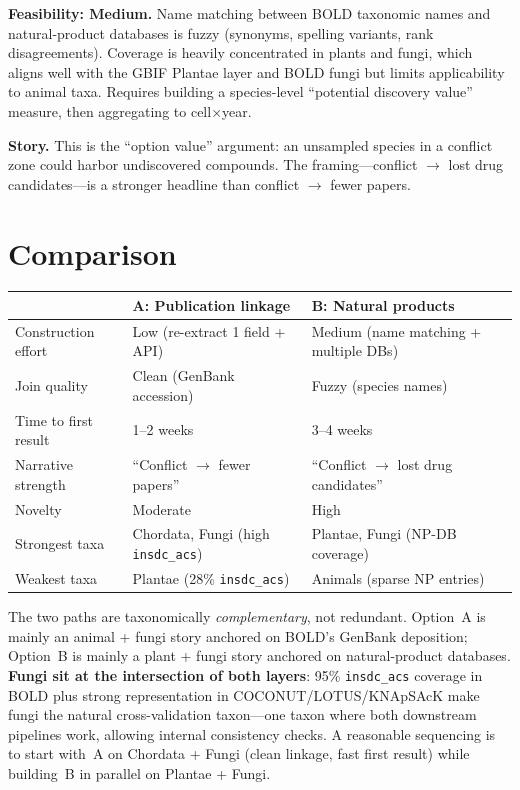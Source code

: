 \documentclass[10pt]{article}
\begin{document}
\textbf{Feasibility: Medium.} Name matching between BOLD taxonomic names and natural-product databases is fuzzy (synonyms, spelling variants, rank disagreements). Coverage is heavily concentrated in plants and fungi, which aligns well with the GBIF Plantae layer and BOLD fungi but limits applicability to animal taxa. Requires building a species-level ``potential discovery value'' measure, then aggregating to cell$\times$year.

\textbf{Story.} This is the ``option value'' argument: an unsampled species in a conflict zone could harbor undiscovered compounds. The framing---conflict $\to$ lost drug candidates---is a stronger headline than conflict $\to$ fewer papers.

\section*{Comparison}

\begin{center}
\begin{tabular}{lll}
\toprule
 & \textbf{A: Publication linkage} & \textbf{B: Natural products} \\
\midrule
Construction effort & Low (re-extract 1 field + API) & Medium (name matching + multiple DBs) \\
Join quality & Clean (GenBank accession) & Fuzzy (species names) \\
Time to first result & 1--2 weeks & 3--4 weeks \\
Narrative strength & ``Conflict $\to$ fewer papers'' & ``Conflict $\to$ lost drug candidates'' \\
Novelty & Moderate & High \\
Strongest taxa & Chordata, Fungi (high \texttt{insdc\_acs}) & Plantae, Fungi (NP-DB coverage) \\
Weakest taxa & Plantae (28\% \texttt{insdc\_acs}) & Animals (sparse NP entries) \\
\bottomrule
\end{tabular}
\end{center}

The two paths are taxonomically \emph{complementary}, not redundant. Option~A is mainly an animal + fungi story anchored on BOLD's GenBank deposition; Option~B is mainly a plant + fungi story anchored on natural-product databases. \textbf{Fungi sit at the intersection of both layers}: 95\% \texttt{insdc\_acs} coverage in BOLD plus strong representation in COCONUT/LOTUS/KNApSAcK make fungi the natural cross-validation taxon---one taxon where both downstream pipelines work, allowing internal consistency checks. A reasonable sequencing is to start with~A on Chordata + Fungi (clean linkage, fast first result) while building~B in parallel on Plantae + Fungi.
\end{document}
